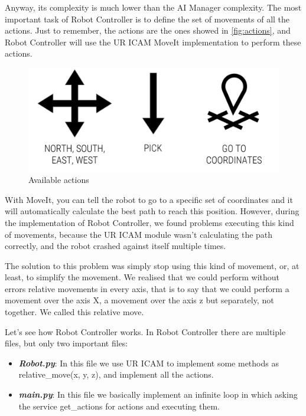 		Anyway, its complexity is much lower than the AI Manager complexity. The most important task of Robot Controller is to define the set of movements of all the actions. Just to remember, the actions are the ones showed in \autoref{fig:actions}, and Robot Controller will use the UR ICAM MoveIt implementation to perform these actions.
		
		\begin{figure}[H]
			\centering
			\includegraphics[width=0.9\linewidth]{Images/actions}
			\caption[Actions]{Available actions}
			\label{fig:actions}
		\end{figure}
	
		 With MoveIt, you can tell the robot to go to a specific set of coordinates and it will automatically calculate the best path to reach this position. However, during the implementation of Robot Controller, we found problems executing this kind of movements, because the UR ICAM module wasn't calculating the path correctly, and the robot crashed against itself multiple times. 
		 
		 The solution to this problem was simply stop using this kind of movement, or, at least, to simplify the movement. We realised that we could perform without errors relative movements in every axis, that is to say that we could perform a movement over the axis X, a movement over the axis z but separately, not together. We called this relative move.
		 
		 Let's see how Robot Controller works. In Robot Controller there are multiple files, but only two important files:
		 
		 \begin{itemize}
		 	\item[\textendash]\textbf{\textit{Robot.py}}: In this file we use UR ICAM to implement some methods as relative\_move(x, y, z), and implement all the actions.
		 	\item[\textendash]\textbf{\textit{main.py}}: In this file we basically implement an infinite loop in which asking the service get\_actions for actions and executing them.
		 \end{itemize}
	 
